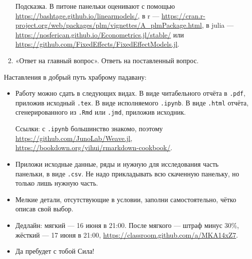 \documentclass[12pt]{article}
\begin{document}
\begin{enumerate}
    Подсказка. В питоне панельки оценивают с помощью \url{https://bashtage.github.io/linearmodels/}, в r — \url{https://cran.r-project.org/web/packages/plm/vignettes/A_plmPackage.html},
    в julia — \url{https://nosferican.github.io/Econometrics.jl/stable/} или \url{https://github.com/FixedEffects/FixedEffectModels.jl}.
    \item «Ответ на главный вопрос». Ответь на поставленный вопрос. 

\end{enumerate}

Наставления в добрый путь храброму падавану:

\begin{itemize}
    \item Работу можно сдать в следующих видах. В виде читабельного отчёта в \verb|.pdf|, приложив исходный \verb|.tex|. 
    В виде исполняемого \verb|.ipynb|. В виде \verb|.html| отчёта, сгенерированного из \verb|.Rmd| или \verb|.jmd|, приложив исходник. 

    Ссылки: с \verb|.ipynb| большинство знакомо, поэтому \url{https://github.com/JunoLab/Weave.jl}, \url{https://bookdown.org/yihui/rmarkdown-cookbook/}.

    \item Приложи исходные данные, ряды и нужную для исследования часть панельки, в виде \verb|.csv|. 
    Не надо прикладывать всю скаченную панельку, но только лишь нужную часть. 

    \item Мелкие детали, отсутствующие в условии, заполни самостоятельно, чётко описав свой выбор.
    
    \item Дедлайн: мягкий — 16 июня в 21:00. После мягкого — штраф минус 30\%, жёсткий — 17 июня в 21:00, \url{https://classroom.github.com/a/MKA14xZ7}. 
    
    \item Да пребудет с тобой Сила!
\end{itemize}
\end{document}
